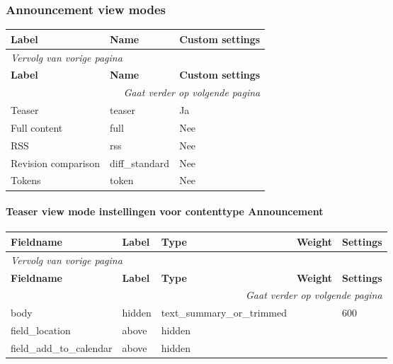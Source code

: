 \subsubsection{Announcement view modes}
  \begin{longtable}{| p{5.00cm}|p{5.00cm}|p{5.00cm}|}
  \hline
  \rowcolor{tableheader}
  \textbf{Label} & \textbf{Name} & \textbf{Custom settings}  \tabularnewline
  \hline
\endfirsthead
\multicolumn{3}{l}{\textit{Vervolg van vorige pagina}} \\
\hline
\rowcolor{tableheader}
  \textbf{Label} & \textbf{Name} & \textbf{Custom settings}  \tabularnewline
  \hline
\hline
\endhead
\multicolumn{3}{r}{\textit{Gaat verder op volgende pagina}} \\
\endfoot
\hline
\endlastfoot
  Teaser & teaser & Ja  \tabularnewline
  \hline
  Full content & full & Nee  \tabularnewline
  \hline
  RSS & rss & Nee  \tabularnewline
  \hline
  Revision comparison & diff\_standard & Nee  \tabularnewline
  \hline
  Tokens & token & Nee  \tabularnewline
  \hline
  \end{longtable}

\paragraph{Teaser view mode instellingen voor contenttype Announcement }

  \begin{longtable}{| p{3.00cm}|p{3.00cm}|p{3.00cm}|p{3.00cm}|p{3.00cm}|}
  \hline
  \rowcolor{tableheader}
  \textbf{Fieldname} & \textbf{Label} & \textbf{Type} & \textbf{Weight} & \textbf{Settings}  \tabularnewline
  \hline
\endfirsthead
\multicolumn{5}{l}{\textit{Vervolg van vorige pagina}} \\
\hline
\rowcolor{tableheader}
  \textbf{Fieldname} & \textbf{Label} & \textbf{Type} & \textbf{Weight} & \textbf{Settings}  \tabularnewline
  \hline
\hline
\endhead
\multicolumn{5}{r}{\textit{Gaat verder op volgende pagina}} \\
\endfoot
\hline
\endlastfoot
  body & hidden & text\_summary\_or\_trimmed &   & 600  \tabularnewline
  \hline
  field\_location & above & hidden &   &    \tabularnewline
  \hline
  field\_add\_to\_calendar & above & hidden &   &    \tabularnewline
  \hline
  \end{longtable}

